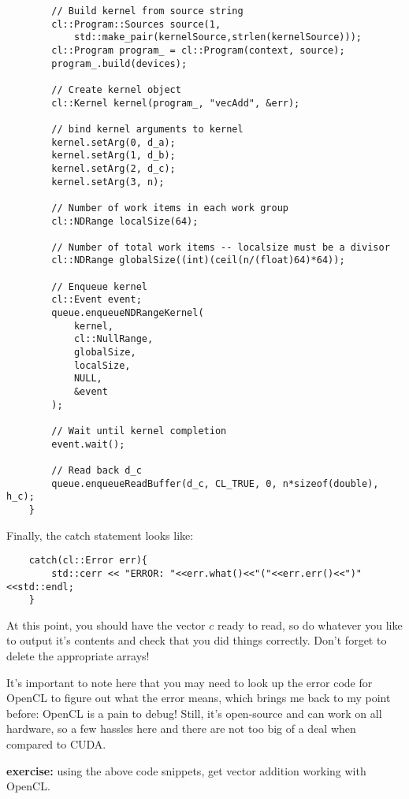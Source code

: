 \documentclass[11pt]{article}
\begin{document}
\begin{lstlisting}
        // Build kernel from source string
        cl::Program::Sources source(1,
            std::make_pair(kernelSource,strlen(kernelSource)));
        cl::Program program_ = cl::Program(context, source);
        program_.build(devices);

        // Create kernel object
        cl::Kernel kernel(program_, "vecAdd", &err);

        // bind kernel arguments to kernel
        kernel.setArg(0, d_a);
        kernel.setArg(1, d_b);
        kernel.setArg(2, d_c);
        kernel.setArg(3, n);

        // Number of work items in each work group
        cl::NDRange localSize(64);

        // Number of total work items -- localsize must be a divisor
        cl::NDRange globalSize((int)(ceil(n/(float)64)*64));

        // Enqueue kernel
        cl::Event event;
        queue.enqueueNDRangeKernel(
            kernel,
            cl::NullRange,
            globalSize,
            localSize,
            NULL,
            &event
        );

        // Wait until kernel completion
        event.wait();

        // Read back d_c
        queue.enqueueReadBuffer(d_c, CL_TRUE, 0, n*sizeof(double), h_c);
    }

\end{lstlisting}

Finally, the catch statement looks like:

\begin{lstlisting}
    catch(cl::Error err){
        std::cerr << "ERROR: "<<err.what()<<"("<<err.err()<<")"<<std::endl;
    }
\end{lstlisting}

At this point, you should have the vector $c$ ready to read, so do whatever you like to output it's contents and check that you did things correctly. Don't forget to delete the appropriate arrays!

It's important to note here that you may need to look up the error code for OpenCL to figure out what the error means, which brings me back to my point before: OpenCL is a pain to debug!
Still, it's open-source and can work on all hardware, so a few hassles here and there are not too big of a deal when compared to CUDA.

\textbf{exercise:} using the above code snippets, get vector addition working with OpenCL.
\end{document}
